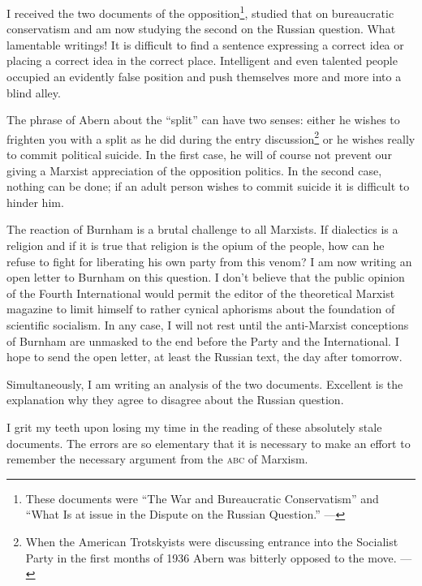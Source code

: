 I received the two documents of the opposition\footnote{These documents were ``The War and Bureaucratic Conservatism'' and ``What Is at issue in the Dispute on the Russian Question.'' ---\ed}, studied that on bureaucratic conservatism and am now studying the second on the Russian question. What lamentable writings! It is difficult to find a sentence expressing a correct idea or placing a correct idea in the correct place. Intelligent and even talented people occupied an evidently false position and push themselves more and more into a blind alley.

The phrase of Abern about the “split” can have two senses: either he wishes to frighten you with a split as he did during the entry discussion\footnote{When the American Trotskyists were discussing entrance into the Socialist Party in the first months of 1936 Abern was bitterly opposed to the move. ---\ed} or he wishes really to commit political suicide. In the first case, he will of course not prevent our giving a Marxist appreciation of the opposition politics. In the second case, nothing can be done; if an adult person wishes to commit suicide it is difficult to hinder him.

The reaction of Burnham is a brutal challenge to all Marxists. If dialectics is a religion and if it is true that religion is the opium of the people, how can he refuse to fight for liberating his own party from this venom? I am now writing an open letter to Burnham on this question. I don’t believe that the public opinion of the Fourth International would permit the editor of the theoretical Marxist magazine to limit himself to rather cynical aphorisms about the foundation of scientific socialism. In any case, I will not rest until the anti-Marxist conceptions of Burnham are unmasked to the end before the Party and the International. I hope to send the open letter, at least the Russian text, the day after tomorrow.

Simultaneously, I am writing an analysis of the two documents. Excellent is the explanation why they agree to disagree about the Russian question.

I grit my teeth upon losing my time in the reading of these absolutely stale documents. The errors are so elementary that it is necessary to make an effort to remember the necessary argument from the \textsc{abc} of Marxism.


\baselineskip
\hrulefill


